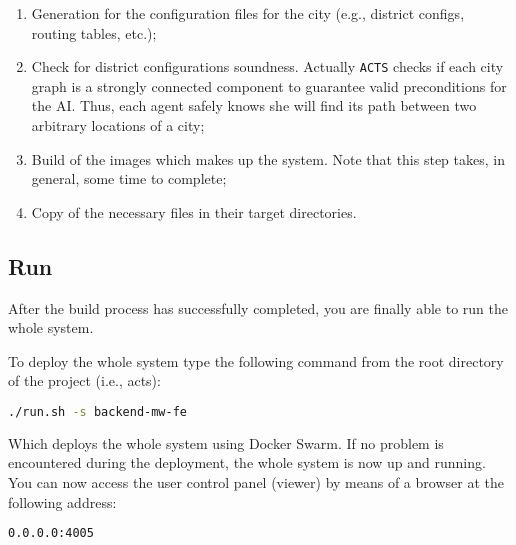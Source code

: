 \begin{enumerate}
\item Generation for the configuration files for the city (e.g., district
  configs, routing tables, etc.);
\item Check for district configurations soundness. Actually \texttt{ACTS}
  checks if each city graph is a strongly connected component to guarantee
  valid preconditions for the AI. Thus, each agent safely knows she will
  find its path between two arbitrary locations of a city;
\item Build of the images which makes up the system. Note that this step
  takes, in general, some time to complete;
\item Copy of the necessary files in their target directories.
\end{enumerate}

\subsection{Run}

After the build process has successfully completed, you are finally able to
run the whole system.

To deploy the whole system type the following command from the root directory
of the project (i.e., acts):

\begin{lstlisting}[language=bash]
./run.sh -s backend-mw-fe
\end{lstlisting}

Which deploys the whole system using Docker Swarm.
If no problem is encountered during the deployment, the whole system is now up
and running.
You can now access the user control panel (viewer) by means of a browser at the
following address:

\begin{lstlisting}[language=bash]
0.0.0.0:4005
\end{lstlisting}
